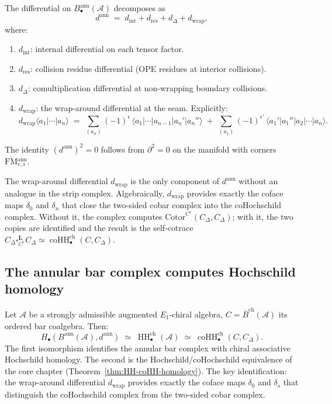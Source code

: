 \documentclass[11pt]{article}
\newcommand{\cA}{\mathcal{A}}
\newcommand{\barB}{\overline{B}}
\newcommand{\FM}{\mathrm{FM}}
\newcommand{\HH}{\operatorname{HH}}
\begin{document}
\begin{theorem}
\label{thm:annular-bar-differential-wn}
The differential on $B^{\mathrm{ann}}_\bullet(\cA)$ decomposes as
\[
d^{\mathrm{ann}}
\;=\;
d_{\mathrm{int}}+d_{\mathrm{res}}+d_\Delta+d_{\mathrm{wrap}},
\]
where:
\begin{enumerate}[label=\textup{(\alph*)}]
\item $d_{\mathrm{int}}$: internal differential on each tensor factor.
\item $d_{\mathrm{res}}$: collision residue differential (OPE residues at interior collisions).
\item $d_\Delta$: comultiplication differential at non-wrapping boundary collisions.
\item $d_{\mathrm{wrap}}$: the wrap-around differential at the seam.  Explicitly:
\[
d_{\mathrm{wrap}}\langle a_1|\cdots|a_n\rangle
\;=\;
\sum_{(a_n)}
(-1)^{\epsilon}\,
\langle a_1|\cdots|a_{n-1}|a_n'|a_n''\rangle
\;+\;
\sum_{(a_1)}
(-1)^{\epsilon'}\,
\langle a_1'|a_1''|a_2|\cdots|a_n\rangle.
\]
\end{enumerate}
The identity $(d^{\mathrm{ann}})^2=0$ follows from
$\partial^2=0$ on the manifold with corners
$\overline{\FM}{}^{\mathrm{ann}}_{r,s}$.
\end{theorem}

\begin{observation}
The wrap-around differential $d_{\mathrm{wrap}}$ is the only
component of $d^{\mathrm{ann}}$ without an analogue in the strip
complex.  Algebraically, $d_{\mathrm{wrap}}$
provides exactly the coface maps $\delta_0$ and $\delta_n$ that
close the two-sided cobar complex into the coHochschild complex.
Without it, the complex computes
$\mathrm{Cotor}^{C^e}(C_\Delta,C_\Delta)$; with it, the two copies
are identified and the result is the self-cotrace
$C_\Delta\square_{C^e}^{\mathbf L}
C_\Delta\simeq\operatorname{coHH}_\bullet^{\mathrm{ch}}(C,C_\Delta)$.
\end{observation}

\subsection{The annular bar complex computes Hochschild homology}
\label{subsec:annular-HH-wn}

\begin{theorem}[Annular bar complex $=$ Hochschild homology]
\label{thm:annular-HH-wn}
Let $\cA$ be a strongly admissible augmented $E_1$-chiral algebra,
$C=\barB^{\mathrm{ch}}(\cA)$ its ordered bar coalgebra.  Then:
\[
H_\bullet(B^{\mathrm{ann}}(\cA),d^{\mathrm{ann}})
\;\simeq\;
\HH_\bullet^{\mathrm{ch}}(\cA)
\;\simeq\;
\operatorname{coHH}_\bullet^{\mathrm{ch}}(C,C_\Delta).
\]
The first isomorphism identifies the annular bar complex with
chiral associative Hochschild homology.  The second is the
Hochschild/coHochschild equivalence of the core chapter
(Theorem~\ref{thm:HH-coHH-homology}).
The key identification: the wrap-around differential
$d_{\mathrm{wrap}}$ provides exactly the coface maps $\delta_0$
and $\delta_s$ that distinguish the coHochschild complex from the
two-sided cobar complex.
\end{theorem}
\end{document}
